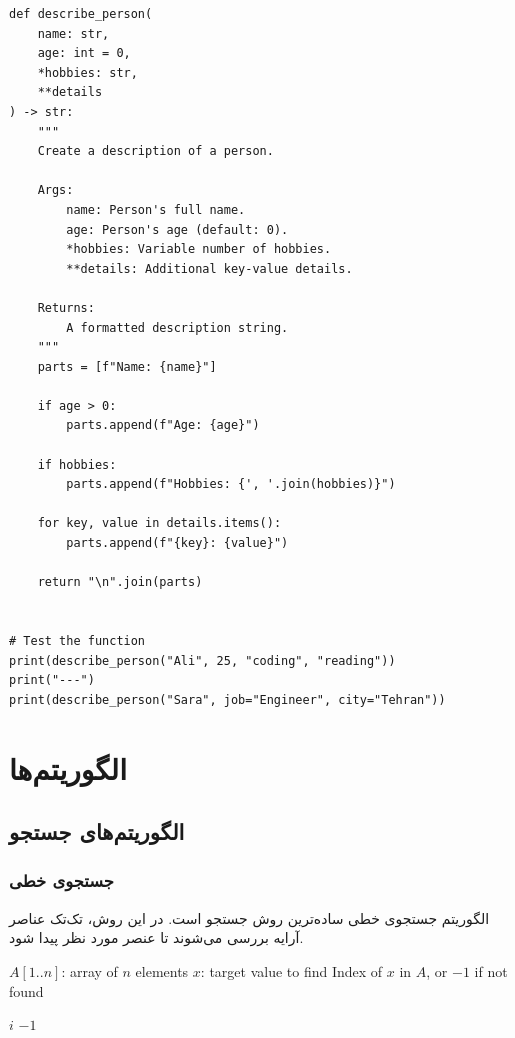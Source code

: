 \documentclass{matinbook}
\begin{document}
\begin{latin}
\begin{verbatim}
def describe_person(
    name: str,
    age: int = 0,
    *hobbies: str,
    **details
) -> str:
    """
    Create a description of a person.
    
    Args:
        name: Person's full name.
        age: Person's age (default: 0).
        *hobbies: Variable number of hobbies.
        **details: Additional key-value details.
    
    Returns:
        A formatted description string.
    """
    parts = [f"Name: {name}"]
    
    if age > 0:
        parts.append(f"Age: {age}")
    
    if hobbies:
        parts.append(f"Hobbies: {', '.join(hobbies)}")
    
    for key, value in details.items():
        parts.append(f"{key}: {value}")
    
    return "\n".join(parts)


# Test the function
print(describe_person("Ali", 25, "coding", "reading"))
print("---")
print(describe_person("Sara", job="Engineer", city="Tehran"))
\end{verbatim}
\end{latin}
\label{code:arguments}

\part{الگوریتم‌ها}

\chapter{الگوریتم‌های جستجو}
\label{chap:search}

\section{جستجوی خطی}

الگوریتم جستجوی خطی
ساده‌ترین روش جستجو است. در این روش،
تک‌تک عناصر آرایه بررسی می‌شوند
تا عنصر مورد نظر پیدا شود.

\begin{latin}
\begin{algorithm}
\begin{algorithmic}[1]
    \Require $A[1..n]$: array of $n$ elements
    \Require $x$: target value to find
    \Ensure Index of $x$ in $A$, or $-1$ if not found
    
            \State \Return $i$
        \EndIf
    \EndFor
    \State \Return $-1$
\end{algorithmic}
\end{algorithm}
\end{latin}
\end{document}

